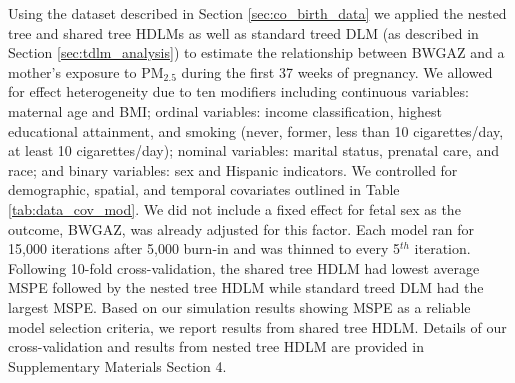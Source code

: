 \documentclass[12pt]{article}
\begin{document}

Using the dataset described in Section \ref{sec:co_birth_data} we applied the nested tree and shared tree HDLMs as well as standard treed DLM (as described in Section \ref{sec:tdlm_analysis}) to estimate the relationship between BWGAZ and a mother's exposure to PM$_{2.5}$ during the first 37 weeks of pregnancy. We allowed for effect heterogeneity due to ten modifiers including continuous variables: maternal age and BMI; ordinal variables: income classification, highest educational attainment, and smoking (never, former, less than 10 cigarettes/day, at least 10 cigarettes/day); nominal variables: marital status, prenatal care, and race; and binary variables: sex and Hispanic indicators. We controlled for demographic, spatial, and temporal covariates outlined in Table \ref{tab:data_cov_mod}. We did not include a fixed effect for fetal sex as the outcome, BWGAZ, was already adjusted for this factor. Each model ran for 15,000 iterations after 5,000 burn-in and was thinned to every 5$^{th}$ iteration. Following 10-fold cross-validation, the shared tree HDLM had lowest average MSPE followed by the nested tree HDLM while standard treed DLM had the largest MSPE. Based on our simulation results showing MSPE as a reliable model selection criteria, we report results from shared tree HDLM. Details of our cross-validation and results from nested tree HDLM are provided in Supplementary Materials Section 4.
\end{document}
